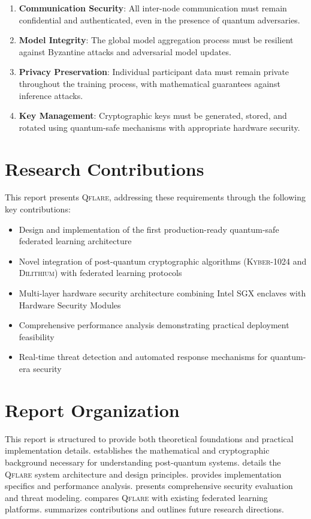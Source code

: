 \documentclass[12pt,a4paper,twoside]{book}
\newcommand{\qflare}{\textsc{Qflare}}
\newcommand{\kyber}{\textsc{Kyber}}
\newcommand{\dilithium}{\textsc{Dilithium}}
\begin{document}
\begin{enumerate}
\item \textbf{Communication Security}: All inter-node communication must remain confidential and authenticated, even in the presence of quantum adversaries.
\item \textbf{Model Integrity}: The global model aggregation process must be resilient against Byzantine attacks and adversarial model updates.
\item \textbf{Privacy Preservation}: Individual participant data must remain private throughout the training process, with mathematical guarantees against inference attacks.
\item \textbf{Key Management}: Cryptographic keys must be generated, stored, and rotated using quantum-safe mechanisms with appropriate hardware security.
\end{enumerate}

\section{Research Contributions}
\label{sec:contributions}

This report presents \qflare{}, addressing these requirements through the following key contributions:

\begin{itemize}
\item Design and implementation of the first production-ready quantum-safe federated learning architecture
\item Novel integration of post-quantum cryptographic algorithms (\kyber{}-1024 and \dilithium{}) with federated learning protocols
\item Multi-layer hardware security architecture combining Intel SGX enclaves with Hardware Security Modules
\item Comprehensive performance analysis demonstrating practical deployment feasibility
\item Real-time threat detection and automated response mechanisms for quantum-era security
\end{itemize}

\section{Report Organization}
\label{sec:organization}

This report is structured to provide both theoretical foundations and practical implementation details.  establishes the mathematical and cryptographic background necessary for understanding post-quantum systems.  details the \qflare{} system architecture and design principles.  provides implementation specifics and performance analysis.  presents comprehensive security evaluation and threat modeling.  compares \qflare{} with existing federated learning platforms.  summarizes contributions and outlines future research directions.
\end{document}
